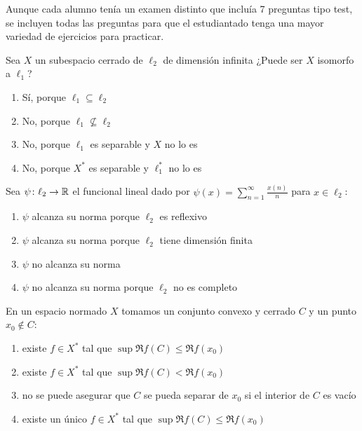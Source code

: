 \documentclass[12pt]{article}
\begin{document}
Aunque cada alumno tenía un examen distinto que incluía 7 preguntas tipo test, se incluyen todas las preguntas para que el estudiantado tenga una mayor variedad de ejercicios para practicar.
\begin{ejercicio}
    Sea $X$ un subespacio cerrado de $\ell_{2}$ de dimensión infinita ¿Puede ser $X$ isomorfo a $\ell_1$?
    \begin{enumerate}[label={\arabic*)}]
        \item Sí, porque $\ell_1 \subseteq \ell_{2}$
        \item No, porque $\ell_1 \nsubseteq \ell_{2}$
        \item No, porque $\ell_1$ es separable y $X$ no lo es
        \item No, porque $X^*$ es separable y $\ell_1^*$ no lo es
    \end{enumerate}
\end{ejercicio}

\begin{ejercicio}
    Sea $\psi \colon \ell_2 \to \mathbb{R}$ el funcional lineal dado por $\psi(x) = \sum\limits_{n=1}^\infty \frac{x(n)}{n}$ para $x \in \ell_2$:
    \begin{enumerate}[label={\arabic*)}]
        \item $\psi$ alcanza su norma porque $\ell_2$ es reflexivo
        \item $\psi$ alcanza su norma porque $\ell_2$ tiene dimensión finita
        \item $\psi$ no alcanza su norma
        \item $\psi$ no alcanza su norma porque $\ell_2$ no es completo
    \end{enumerate}
\end{ejercicio}

\begin{ejercicio}
    En un espacio normado $X$ tomamos un conjunto convexo y cerrado $C$ y un punto $x_0 \notin C$:
    \begin{enumerate}[label={\arabic*)}]
        \item existe $f \in X^*$ tal que $\sup \Re f(C) \leq \Re f(x_0)$
        \item existe $f \in X^*$ tal que $\sup \Re f(C) < \Re f(x_0)$
        \item no se puede asegurar que $C$ se pueda separar de $x_0$ si el interior de $C$ es vacío
        \item existe un único $f \in X^*$ tal que $\sup \Re f(C) \leq \Re f(x_0)$
    \end{enumerate}
\end{ejercicio}
\end{document}
